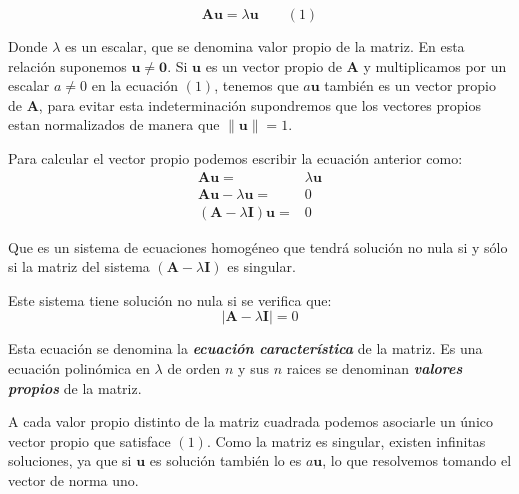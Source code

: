 \documentclass[12pt,letterpaper]{report} %
\begin{document}
$$\mathbf{Au}=\lambda\mathbf{u} \qquad (1)$$ 

Donde $\lambda$ es un escalar, que se denomina valor propio de la matriz. En esta relación suponemos $\mathbf{u} \ne \mathbf{0}$. Si $\mathbf{u}$ es un vector propio de $\mathbf{A}$ y multiplicamos por un escalar $a \ne 0$ en la ecuación $(1)$, tenemos que $a\mathbf{u}$ también es un vector propio de $\mathbf{A}$, para evitar esta indeterminación supondremos que los vectores propios estan normalizados de manera que $\left\| \mathbf{u} \right\|=1$.

Para calcular el vector propio podemos escribir la ecuación anterior como:
$$
\begin{array}{rl}
\mathbf{Au} = & \lambda\mathbf{u}\\
\mathbf{Au}- \lambda\mathbf{u} = & 0\\
(\mathbf{A}- \lambda\mathbf{I})\mathbf{u} = & 0
\end{array}
$$

Que es un sistema de ecuaciones homogéneo que tendrá solución no nula si y sólo si la matriz del sistema $(\mathbf{A}- \lambda\mathbf{I})$ es singular.

Este sistema tiene solución no nula si se verifica que:
$$|\mathbf{A}- \lambda\mathbf{I}|=0$$

Esta ecuación se denomina la \textit{\textbf{ecuación característica}} de la matriz. Es una ecuación polinómica en $\lambda$ de orden $n$ y sus $n$ raices se denominan \textit{\textbf{valores propios}} de la matriz.

A cada valor propio distinto de la matriz cuadrada podemos asociarle un único vector propio que satisface $(1)$. Como la matriz es singular, existen infinitas soluciones, ya que si $\mathbf{u}$ es solución también lo es $a\mathbf{u}$, lo que resolvemos tomando el vector de norma uno.
\end{document}
